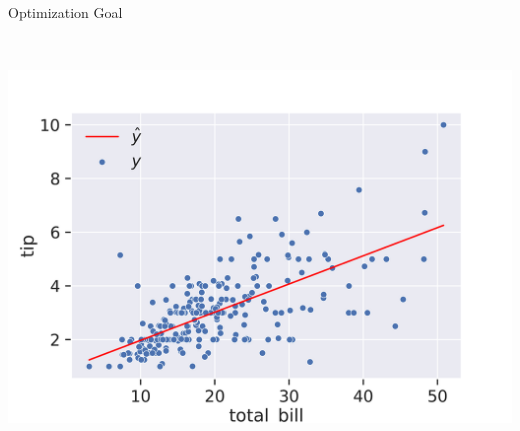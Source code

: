 \documentclass[aspectratio=169]{../latex_main/tntbeamer}  %
\begin{document}
\begin{frame}{Optimization Goal}
\begin{columns}
	        
	        \begin{column}{.5\textwidth}
	                \\
	                \includegraphics[scale=.4]{Bild16}
	        \end{column}
	    \end{columns}
	    
	\end{frame}
	
	
	
\end{document}
